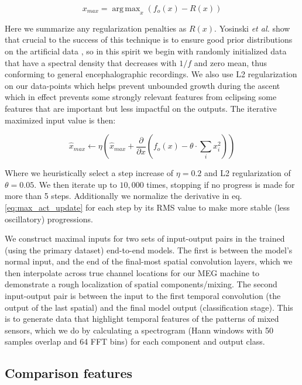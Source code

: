 \documentclass[fleqn,10pt]{wlscirep}
\DeclareMathOperator*{\argmaxA}{arg\,max}
\begin{document}
\begin{equation} \label{eq:max_act}
  x_{max} = \argmaxA_x(f_o(x) - R(x))
\end{equation}

Here we summarize any regularization penalties as $R(x)$. Yosinski {\em et al.} show that crucial to the success of this technique is to ensure good prior distributions on the artificial data \cite{Yosinski2015}, so in this spirit we begin with randomly initialized data that have a spectral density that decreases with $1/f$ and zero mean, thus conforming to general encephalographic recordings. We also use L2 regularization on our data-points which helps prevent unbounded growth during the ascent which in effect prevents some strongly relevant features from eclipsing some features that are important but less impactful on the outputs. The iterative maximized input value is then:

\begin{equation} \label{eq:max_act_update}
  \hat{x}_{max} \leftarrow \eta \left(\hat{x}_{max} + \frac{\partial }{\partial x}(f_o(x) - \theta \cdot {}\sum_ix_i^2) \right)
\end{equation}

Where we heuristically select a step increase of $\eta = 0.2$ and L2 regularization of $\theta = 0.05$. We then iterate up to $10,000$ times, stopping if no progress is made for more than 5 steps. Additionally we normalize the derivative in eq. \ref{eq:max_act_update} for each step by its RMS value to make more stable (less oscillatory) progressions.

We construct maximal inputs for two sets of input-output pairs in the trained (using the primary dataset) end-to-end models. The first is between the model's normal input, and the end of the final-most spatial convolution layers, which we then interpolate across true channel locations for our MEG machine to demonstrate a rough localization of spatial components/mixing. The second input-output pair is between the input to the first temporal convolution (the output of the last spatial) and the final model output (classification stage). This is to generate data that highlight temporal features of the patterns of mixed sensors, which we do by calculating a spectrogram (Hann windows with 50 samples overlap and 64 FFT bins) for each component and output class.

\subsection*{Comparison features}
\end{document}
